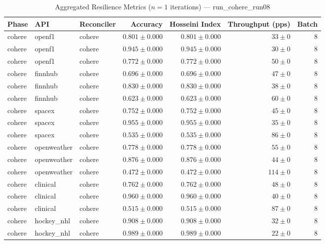 
\begin{table}[htbp]
\caption{Aggregated Resilience Metrics ($n=1$ iterations) --- run_cohere_run08}
\begin{tabular}{l l l r r r r}
\hline
Phase & API & Reconciler & Accuracy & Hosseini Index & Throughput (pps) & Batch \\
\hline
cohere & openf1 & cohere & $0.801\pm0.000$ & $0.801\pm0.000$ & $33\pm0$ & 8 \\
cohere & openf1 & cohere & $0.945\pm0.000$ & $0.945\pm0.000$ & $30\pm0$ & 8 \\
cohere & openf1 & cohere & $0.772\pm0.000$ & $0.772\pm0.000$ & $50\pm0$ & 8 \\
cohere & finnhub & cohere & $0.696\pm0.000$ & $0.696\pm0.000$ & $47\pm0$ & 8 \\
cohere & finnhub & cohere & $0.830\pm0.000$ & $0.830\pm0.000$ & $38\pm0$ & 8 \\
cohere & finnhub & cohere & $0.623\pm0.000$ & $0.623\pm0.000$ & $60\pm0$ & 8 \\
cohere & spacex & cohere & $0.752\pm0.000$ & $0.752\pm0.000$ & $45\pm0$ & 8 \\
cohere & spacex & cohere & $0.955\pm0.000$ & $0.955\pm0.000$ & $35\pm0$ & 8 \\
cohere & spacex & cohere & $0.535\pm0.000$ & $0.535\pm0.000$ & $86\pm0$ & 8 \\
cohere & openweather & cohere & $0.778\pm0.000$ & $0.778\pm0.000$ & $55\pm0$ & 8 \\
cohere & openweather & cohere & $0.876\pm0.000$ & $0.876\pm0.000$ & $44\pm0$ & 8 \\
cohere & openweather & cohere & $0.472\pm0.000$ & $0.472\pm0.000$ & $114\pm0$ & 8 \\
cohere & clinical & cohere & $0.762\pm0.000$ & $0.762\pm0.000$ & $48\pm0$ & 8 \\
cohere & clinical & cohere & $0.960\pm0.000$ & $0.960\pm0.000$ & $40\pm0$ & 8 \\
cohere & clinical & cohere & $0.515\pm0.000$ & $0.515\pm0.000$ & $87\pm0$ & 8 \\
cohere & hockey\_nhl & cohere & $0.908\pm0.000$ & $0.908\pm0.000$ & $32\pm0$ & 8 \\
cohere & hockey\_nhl & cohere & $0.989\pm0.000$ & $0.989\pm0.000$ & $22\pm0$ & 8 \\

\end{tabular}
\end{table}
